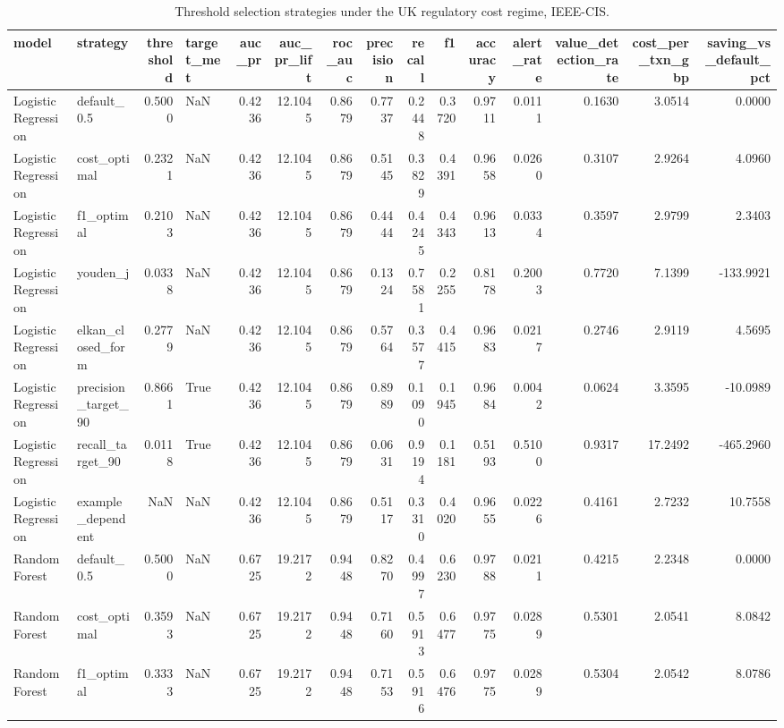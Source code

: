 \begin{table}
\caption{Threshold selection strategies under the UK regulatory cost regime, IEEE-CIS.}
\label{tab:table1_main_results}
\begin{tabular}{llrlrrrrrrrrrrr}
\toprule
model & strategy & threshold & target\_met & auc\_pr & auc\_pr\_lift & roc\_auc & precision & recall & f1 & accuracy & alert\_rate & value\_detection\_rate & cost\_per\_txn\_gbp & saving\_vs\_default\_pct \\
\midrule
Logistic Regression & default\_0.5 & 0.5000 & NaN & 0.4236 & 12.1045 & 0.8679 & 0.7737 & 0.2448 & 0.3720 & 0.9711 & 0.0111 & 0.1630 & 3.0514 & 0.0000 \\
Logistic Regression & cost\_optimal & 0.2321 & NaN & 0.4236 & 12.1045 & 0.8679 & 0.5145 & 0.3829 & 0.4391 & 0.9658 & 0.0260 & 0.3107 & 2.9264 & 4.0960 \\
Logistic Regression & f1\_optimal & 0.2103 & NaN & 0.4236 & 12.1045 & 0.8679 & 0.4444 & 0.4245 & 0.4343 & 0.9613 & 0.0334 & 0.3597 & 2.9799 & 2.3403 \\
Logistic Regression & youden\_j & 0.0338 & NaN & 0.4236 & 12.1045 & 0.8679 & 0.1324 & 0.7581 & 0.2255 & 0.8178 & 0.2003 & 0.7720 & 7.1399 & -133.9921 \\
Logistic Regression & elkan\_closed\_form & 0.2779 & NaN & 0.4236 & 12.1045 & 0.8679 & 0.5764 & 0.3577 & 0.4415 & 0.9683 & 0.0217 & 0.2746 & 2.9119 & 4.5695 \\
Logistic Regression & precision\_target\_90 & 0.8661 & True & 0.4236 & 12.1045 & 0.8679 & 0.8989 & 0.1090 & 0.1945 & 0.9684 & 0.0042 & 0.0624 & 3.3595 & -10.0989 \\
Logistic Regression & recall\_target\_90 & 0.0118 & True & 0.4236 & 12.1045 & 0.8679 & 0.0631 & 0.9194 & 0.1181 & 0.5193 & 0.5100 & 0.9317 & 17.2492 & -465.2960 \\
Logistic Regression & example\_dependent & NaN & NaN & 0.4236 & 12.1045 & 0.8679 & 0.5117 & 0.3310 & 0.4020 & 0.9655 & 0.0226 & 0.4161 & 2.7232 & 10.7558 \\
Random Forest & default\_0.5 & 0.5000 & NaN & 0.6725 & 19.2172 & 0.9448 & 0.8270 & 0.4997 & 0.6230 & 0.9788 & 0.0211 & 0.4215 & 2.2348 & 0.0000 \\
Random Forest & cost\_optimal & 0.3593 & NaN & 0.6725 & 19.2172 & 0.9448 & 0.7160 & 0.5913 & 0.6477 & 0.9775 & 0.0289 & 0.5301 & 2.0541 & 8.0842 \\
Random Forest & f1\_optimal & 0.3333 & NaN & 0.6725 & 19.2172 & 0.9448 & 0.7153 & 0.5916 & 0.6476 & 0.9775 & 0.0289 & 0.5304 & 2.0542 & 8.0786 \\

\end{tabular}
\end{table}
